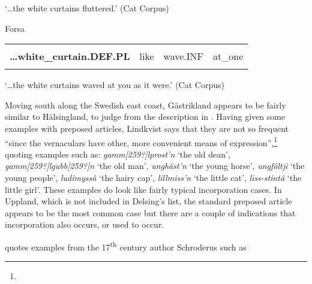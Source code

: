 \begin{styleTranslation}
‘…the white curtains fluttered.’ (Cat Corpus)

\end{styleTranslation}

\begin{styleExLtrTblii}
Forsa

\end{styleExLtrTblii}

\begin{tabular}{llll}
\lsptoprule
\multicolumn{4}{l}{{\bfseries …vitgardinene}

}\\
{\bfseries …white\_curtain.DEF.PL} & like & wave.INF & at\_one\\
\lspbottomrule
\end{tabular}

\begin{styleTranslation}
‘…the white curtains waved at you as it were.’ (Cat Corpus)

\end{styleTranslation}

\begin{styleBodytextC}
Moving south along the Swedish east coast, Gästrikland appears to be fairly similar to Hälsingland, to judge from the description in \citet[79]{Lindkvist1942}.  Having given some examples with preposed articles, Lindkvist says that they are not so frequent “since the vernaculars have other, more convenient means of expression”,\footnote{} quoting examples such as: \textit{gamm[259?]lprost’n} ‘the old dean’, \textit{gamm[259?]lgubb[259?]n} ‘the old man’, \textit{unghäst’n} ‘the young horse’, \textit{ungfôltji} ‘the young people’, \textit{ludimyssâ} ‘the hairy cap’, \textit{lillmiss’n} ‘the little cat’, \textit{liss-stintâ} ‘the little girl’. These examples do look like fairly typical incorporation cases.  In Uppland, which is not included in Delsing’s list, the standard preposed article appears to be the most common case but there are a couple of indications that incorporation also occurs, or used to occur.

\end{styleBodytextC}

\begin{styleBodytextC}
\citet[523]{Hesselman1908} quotes examples from the 17\textsuperscript{th} century author Schroderus such as

\end{styleBodytextC}

